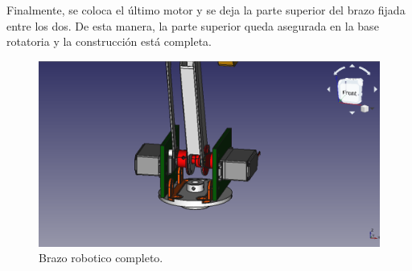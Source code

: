 Finalmente, se coloca el último motor y se deja la parte superior del brazo fijada entre los dos. De esta manera, la parte superior queda asegurada en la base rotatoria y la construcción está completa.


\begin{figure}[H]
    \centering 
    \includegraphics[width=1\linewidth]{pictures/SandwichMotores.png}
    \caption{Brazo robotico completo.}
    \label{fig:brazo_robotico_completo}
\end{figure}
